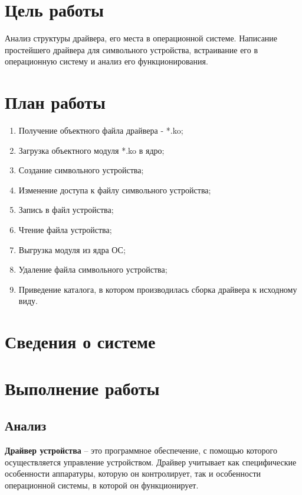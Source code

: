 




\section{Цель работы}
Анализ структуры драйвера, его места в операционной системе. Написание простейшего драйвера для символьного устройства, встраивание его в операционную систему и анализ его функционирования.

\section{План работы}
\begin{enumerate}
\item Получение объектного файла драйвера - *.ko;
\item Загрузка объектного модуля *.ko в ядро;
\item Создание символьного устройства;
\item Изменение доступа к файлу символьного устройства;
\item Запись в файл устройства;
\item Чтение файла устройства;
\item Выгрузка модуля из ядра ОС;
\item Удаление файла символьного устройства;
\item Приведение каталога, в котором производилась сборка драйвера к исходному виду.
\end{enumerate}

\section{Сведения о системе}


\clearpage

\section{Выполнение работы}

\subsection{Анализ}
\textbf{Драйвер устройства} – это программное обеспечение, с помощью которого осуществляется управление устройством. Драйвер учитывает как специфические особенности аппаратуры, которую он контролирует, так и особенности операционной системы, в которой он функционирует. 

